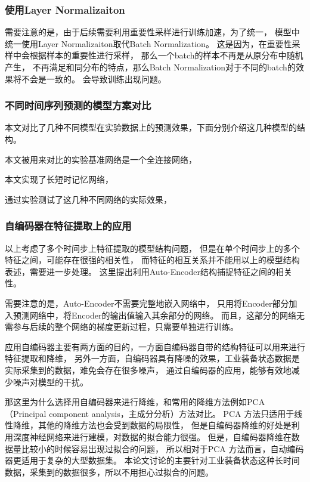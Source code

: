 \subsubsection{使用Layer Normalizaiton}
需要注意的是，由于后续需要利用重要性采样进行训练加速，为了统一，
模型中统一使用Layer Normalizaiton取代Batch Normalization。
这是因为，在重要性采样中会根据样本的重要性进行采样，
那么一个batch的样本不再是从原分布中随机产生，
不再满足和同分布的特点，那么Batch Normalization对于不同的batch的效果将不会是一致的。
会导致训练出现问题。

\subsubsection{不同时间序列预测的模型方案对比}
本文对比了几种不同模型在实验数据上的预测效果，下面分别介绍这几种模型的结构。

本文被用来对比的实验基准网络是一个全连接网络，

本文实现了长短时记忆网络，

通过实验测试了这几种不同网络的实际效果，
\subsubsection{自编码器在特征提取上的应用}
以上考虑了多个时间步上特征提取的模型结构问题，
但是在单个时间步上的多个特征之间，可能存在很强的相关性，
而特征的相互关系并不能用以上的模型结构表述，需要进一步处理。
这里提出利用Auto-Encoder结构捕捉特征之间的相关性。

需要注意的是，Auto-Encoder不需要完整地嵌入网络中，
只用将Encoder部分加入预测网络中，将Encoder的输出值输入其余部分的网络。
而且，这部分的网络无需参与后续的整个网络的梯度更新过程，只需要单独进行训练。

应用自编码器主要有两方面的目的，一方面自编码器自带的结构特征可以用来进行特征提取和降维，
另外一方面，自编码器具有降噪的效果，工业装备状态数据是实际采集到的数据，难免会存在很多噪声，
通过自编码器的应用，能够有效地减少噪声对模型的干扰。

那这里为什么选择用自编码器来进行降维，和常用的降维方法例如PCA
（Principal component analysis，主成分分析）方法对比。
PCA 方法只适用于线性降维，其他的降维方法也会受到数据的局限性，
但是自编码器降维的好处是利用深度神经网络来进行建模，对数据的拟合能力很强。
但是，自编码器降维在数据量比较小的时候容易出现过拟合的问题，
所以相对于PCA 方法而言，自动编码器更适用于复杂的大型数据集。
本论文讨论的主要针对工业装备状态这种长时间数据，采集到的数据很多，所以不用担心过拟合的问题。
